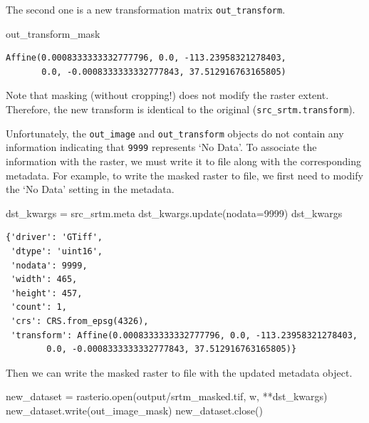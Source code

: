 \documentclass[
  letterpaper,
]{krantz}
\newenvironment{Shaded}{\begin{snugshade}}{\end{snugshade}}
\newcommand{\BuiltInTok}[1]{\textcolor[rgb]{0.00,0.23,0.31}{#1}}
\newcommand{\DecValTok}[1]{\textcolor[rgb]{0.68,0.00,0.00}{#1}}
\newcommand{\NormalTok}[1]{\textcolor[rgb]{0.00,0.23,0.31}{#1}}
\newcommand{\OperatorTok}[1]{\textcolor[rgb]{0.37,0.37,0.37}{#1}}
\newcommand{\StringTok}[1]{\textcolor[rgb]{0.13,0.47,0.30}{#1}}
\begin{document}
The second one is a new transformation matrix \texttt{out\_transform}.

\begin{Shaded}
\begin{Highlighting}[]
\NormalTok{out\_transform\_mask}
\end{Highlighting}
\end{Shaded}

\begin{verbatim}
Affine(0.0008333333332777796, 0.0, -113.23958321278403,
       0.0, -0.0008333333332777843, 37.512916763165805)
\end{verbatim}

Note that masking (without cropping!) does not modify the raster extent.
Therefore, the new transform is identical to the original
(\texttt{src\_srtm.transform}).

Unfortunately, the \texttt{out\_image} and \texttt{out\_transform}
objects do not contain any information indicating that \texttt{9999}
represents `No Data'. To associate the information with the raster, we
must write it to file along with the corresponding metadata. For
example, to write the masked raster to file, we first need to modify the
`No Data' setting in the metadata.

\begin{Shaded}
\begin{Highlighting}[]
\NormalTok{dst\_kwargs }\OperatorTok{=}\NormalTok{ src\_srtm.meta}
\NormalTok{dst\_kwargs.update(nodata}\OperatorTok{=}\DecValTok{9999}\NormalTok{)}
\NormalTok{dst\_kwargs}
\end{Highlighting}
\end{Shaded}

\begin{verbatim}
{'driver': 'GTiff',
 'dtype': 'uint16',
 'nodata': 9999,
 'width': 465,
 'height': 457,
 'count': 1,
 'crs': CRS.from_epsg(4326),
 'transform': Affine(0.0008333333332777796, 0.0, -113.23958321278403,
        0.0, -0.0008333333332777843, 37.512916763165805)}
\end{verbatim}

Then we can write the masked raster to file with the updated metadata
object.

\begin{Shaded}
\begin{Highlighting}[]
\NormalTok{new\_dataset }\OperatorTok{=}\NormalTok{ rasterio.}\BuiltInTok{open}\NormalTok{(}\StringTok{\textquotesingle{}output/srtm\_masked.tif\textquotesingle{}}\NormalTok{, }\StringTok{\textquotesingle{}w\textquotesingle{}}\NormalTok{, }\OperatorTok{**}\NormalTok{dst\_kwargs)}
\NormalTok{new\_dataset.write(out\_image\_mask)}
\NormalTok{new\_dataset.close()}
\end{Highlighting}
\end{Shaded}
\end{document}
